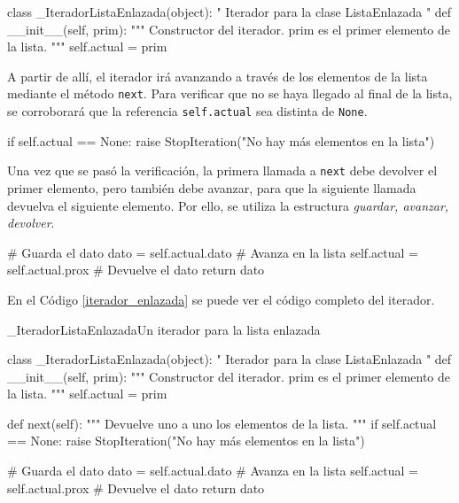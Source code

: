 \begin{codigo-python-sn}
class _IteradorListaEnlazada(object):
    " Iterador para la clase ListaEnlazada "
    def __init__(self, prim):
        """ Constructor del iterador.
            prim es el primer elemento de la lista. """
        self.actual = prim
\end{codigo-python-sn}

A partir de allí, el iterador irá avanzando a través de los elementos de la
lista mediante el método \lstinline!next!.  Para verificar que no se haya
llegado al final de la lista, se corroborará que la referencia
\lstinline!self.actual! sea distinta de \lstinline!None!.

\begin{codigo-python-sn}
        if self.actual == None:
            raise StopIteration("No hay más elementos en la lista")
\end{codigo-python-sn}

Una vez que se pasó la verificación, la primera llamada a \lstinline!next!
debe devolver el primer elemento, pero también debe avanzar, para que la
siguiente llamada devuelva el siguiente elemento.  Por ello, se utiliza la
estructura {\it guardar, avanzar, devolver}.

\begin{codigo-python-sn}
        # Guarda el dato
        dato = self.actual.dato
        # Avanza en la lista
        self.actual = self.actual.prox
        # Devuelve el dato
        return dato
\end{codigo-python-sn}

En el Código \ref{iterador_enlazada} se puede ver el código completo del
iterador.

\begin{codigo}{\_IteradorListaEnlazada}{Un iterador para la lista enlazada}
\label{iterador_enlazada}
\begin{codigo-python}
class _IteradorListaEnlazada(object):
    " Iterador para la clase ListaEnlazada "
    def __init__(self, prim):
        """ Constructor del iterador.
            prim es el primer elemento de la lista. """
        self.actual = prim

    def next(self):
        """ Devuelve uno a uno los elementos de la lista. """
        if self.actual == None:
            raise StopIteration("No hay más elementos en la lista")

        # Guarda el dato
        dato = self.actual.dato
        # Avanza en la lista
        self.actual = self.actual.prox
        # Devuelve el dato
        return dato
\end{codigo-python}
\end{codigo}

